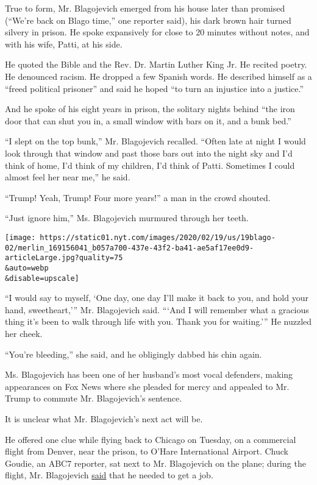 True to form, Mr. Blagojevich emerged from his house later than promised
(``We're back on Blago time,'' one reporter said), his dark brown hair
turned silvery in prison. He spoke expansively for close to 20 minutes
without notes, and with his wife, Patti, at his side.

He quoted the Bible and the Rev. Dr. Martin Luther King Jr. He recited
poetry. He denounced racism. He dropped a few Spanish words. He
described himself as a ``freed political prisoner'' and said he hoped
``to turn an injustice into a justice.''

And he spoke of his eight years in prison, the solitary nights behind
``the iron door that can shut you in, a small window with bars on it,
and a bunk bed.''

``I slept on the top bunk,'' Mr. Blagojevich recalled. ``Often late at
night I would look through that window and past those bars out into the
night sky and I'd think of home, I'd think of my children, I'd think of
Patti. Sometimes I could almost feel her near me,'' he said.

``Trump! Yeah, Trump! Four more years!'' a man in the crowd shouted.

``Just ignore him,'' Ms. Blagojevich murmured through her teeth.

\texttt{[image: https://static01.nyt.com/images/2020/02/19/us/19blago-02/merlin\_169156041\_b057a700-437e-43f2-ba41-ae5af17ee0d9-articleLarge.jpg?quality=75\\\&auto=webp\\\&disable=upscale]}

``I would say to myself, `One day, one day I'll make it back to you, and
hold your hand, sweetheart,''' Mr. Blagojevich said. ```And I will
remember what a gracious thing it's been to walk through life with you.
Thank you for waiting.''' He nuzzled her cheek.

``You're bleeding,'' she said, and he obligingly dabbed his chin again.

Ms. Blagojevich has been one of her husband's most vocal defenders,
making appearances on Fox News where she pleaded for mercy and appealed
to Mr. Trump to commute Mr. Blagojevich's sentence.

It is unclear what Mr. Blagojevich's next act will be.

He offered one clue while flying back to Chicago on Tuesday, on a
commercial flight from Denver, near the prison, to O'Hare International
Airport. Chuck Goudie, an ABC7 reporter, sat next to Mr. Blagojevich on
the plane; during the flight, Mr. Blagojevich
\href{https://abc7chicago.com/politics/what-rod-blagojevich-whispered-in-the-silence-of-a-plane-ride-from-prison/5947389/}{said}
that he needed to get a job.

